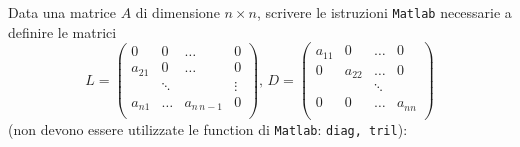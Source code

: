 
\noindent
Data una matrice $A$ di dimensione $n\times n$, scrivere le istruzioni {\tt Matlab} necessarie a definire le matrici
\[ L=
\left( \begin{array}{cccc}
  0 &  0 & \dots & 0 \\
  a_{21}   & 0 & \ldots & 0 \\
&   \ddots&  & \vdots\\
  a_{n1} &  \dots & a_{n\,   n-1}& 0 \\
\end{array} \right), \, D=
\left( \begin{array}{cccc}
  a_{11} & 0 &\dots & 0 \\
  0 & a_{22} & \dots & 0 \\
& & \ddots& \\
  0 & 0&\dots & a_{nn} \\
\end{array} \right)\]
(non devono essere utilizzate le function di {\tt Matlab}: {\tt diag, tril}): 